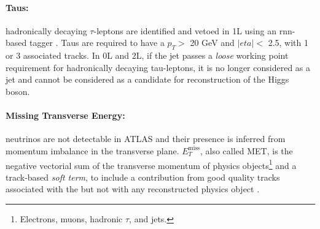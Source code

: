 \paragraph{Taus:} hadronically decaying $\tau$-leptons are identified and vetoed in 1L using an \gls{rnn}-based tagger \cite{ATL-PHYS-PUB-2019-033}. Taus are required to have a $p_T >$ 20 GeV and $|eta| <$ 2.5, with 1 or 3 associated tracks. In 0L and 2L, if the jet passes a \textit{loose} working point requirement for hadronically decaying tau-leptons, it is no longer considered as a jet and cannot be considered as a candidate for reconstruction of the Higgs boson. %

\paragraph{Missing Transverse Energy:} neutrinos are not detectable in ATLAS and their presence is inferred from momentum imbalance in the transverse plane. $E_T^{\textrm{miss}}$, also called MET, is the negative vectorial sum of the transverse momentum of physics objects\footnote{Electrons, muons, hadronic $\tau$, and jets.} and a track-based \textit{soft term}, to include a contribution from good quality tracks associated with the  but not with any reconstructed physics object \cite{ATLASmetReco}. %

